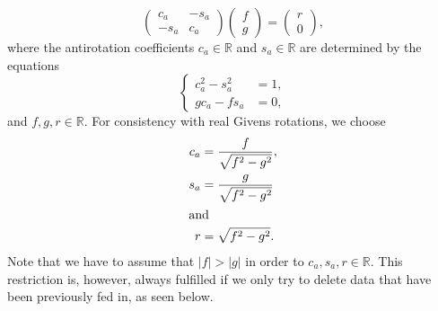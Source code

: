 \documentclass[a4paper,twoside]{refrep}
\newcommand{\R}{{\mathbb R}}
\begin{document}
\begin{equation}
\begin{pmatrix}
c_{a} & -s_{a} \\-s_{a} & c_{a} 
\end{pmatrix}
\begin{pmatrix}
f \\ g
\end{pmatrix}=
\begin{pmatrix}
r\\0
\end{pmatrix},
\end{equation}
where the antirotation coefficients $c_{a}\in\R$ and $s_{a}\in\R$ are determined by the equations
\begin{equation}
\left\{
\begin{matrix}  c_a^{2} - s_a^{2} & = 1, \\  gc_a - fs_a & = 0, \end{matrix}\right.
\end{equation}
and $f,g,r\in\R$. For consistency with real Givens rotations, we choose 
\begin{align}
c_a &= \frac{f}{\sqrt{f^2 - g^2}},\\
s_a &= \frac{g}{\sqrt{f^2 - g^2}}\\
\intertext{and}
r &= \sqrt{f^2 - g^2} .
\end{align}
Note that we have to assume that $|f| > |g|$ in order to $c_a,s_a,r\in{\mathbb R}$. This restriction is, however, always fulfilled if we only try  to delete data that have been previously fed in, as seen below.  
\end{document}
